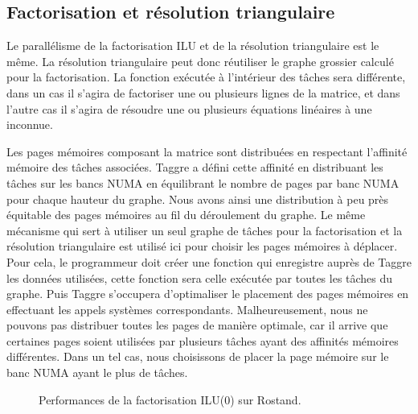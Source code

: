 \subsection{Factorisation et résolution triangulaire}
Le parallélisme de la factorisation ILU et de la résolution triangulaire est le même.
%
La résolution triangulaire peut donc réutiliser le graphe grossier calculé pour la factorisation.
%
La fonction exécutée à l'intérieur des tâches sera différente, dans un cas il s'agira de factoriser une ou plusieurs lignes de la matrice, et dans l'autre cas il s'agira de résoudre une ou plusieurs équations linéaires à une inconnue.



Les pages mémoires composant la matrice sont distribuées en respectant l'affinité mémoire des tâches associées.
%
Taggre a défini cette affinité en distribuant les tâches sur les bancs NUMA en équilibrant le nombre de pages par banc NUMA pour chaque hauteur du graphe.
%
Nous avons ainsi une distribution à peu près équitable des pages mémoires au fil du déroulement du graphe.
%
Le même mécanisme qui sert à utiliser un seul graphe de tâches pour la factorisation et la résolution triangulaire est utilisé ici pour choisir les pages mémoires à déplacer.
%
Pour cela, le programmeur doit créer une fonction qui enregistre auprès de Taggre les données utilisées, cette fonction sera celle exécutée par toutes les tâches du graphe.
%
Puis Taggre s'occupera d'optimaliser le placement des pages mémoires en effectuant les appels systèmes correspondants.
%
Malheureusement, nous ne pouvons pas distribuer toutes les pages de manière optimale, car il arrive que certaines pages soient utilisées par plusieurs tâches ayant des affinités mémoires différentes.
%
Dans un tel cas, nous choisissons de placer la page mémoire sur le banc NUMA ayant le plus de tâches.



\begin{figure}[p]
     \begin{center}
    \end{center}
    \caption{Performances de la factorisation ILU(0) sur Rostand.}
\end{figure}

